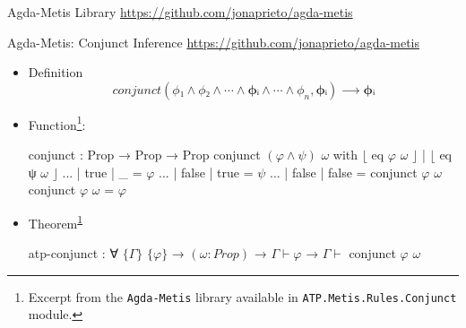 \documentclass[xetex, hyperref={pdfpagelabels=false}]{beamer}
\begin{document}
\begin{frame}[fragile, label=agda-metis]{Agda-Metis Library}
  {\url{https://github.com/jonaprieto/agda-metis}}
\vfill
\begin{table}[!ht]
\begin{center}
\end{center}
\label{tab:agda-metis-table}
\end{table}
\vfill
\end{frame}


\begin{frame}[fragile, label=atp-conjunct]{Agda-Metis: Conjunct Inference}
   {\url{https://github.com/jonaprieto/agda-metis}}
\begin{itemize}
\item Definition
  \begin{equation*}
  conjunct (ϕ₁ ∧  ϕ₂ ∧ ⋯ ∧ \mathbf{ϕᵢ} ∧ ⋯ ∧ \phi_n, \mathbf{ϕᵢ}) ⟶ \mathbf{ϕᵢ}
  \end{equation*}

\item Function\footnote{\label{note-conjunct}Excerpt from the \texttt{Agda-Metis} library available in  \texttt{ATP.Metis.Rules.Conjunct} module.}:
\begin{agda}
conjunct : Prop → Prop → Prop
conjunct $(φ \wedge ψ)$ $ω$ with $⌊$ eq $φ$ $ω$ $⌋$ | $⌊$ eq ψ $ω$ $⌋$
... | true  | _     = $φ$
... | false | true  = $ψ$
... | false | false = conjunct $φ$ $ω$
conjunct $φ$ $ω$       = $φ$
\end{agda}
\item Theorem\textsuperscript{\ref{note-conjunct}}
\begin{agda}
atp-conjunct
  : ∀ $\{Γ\}$ $\{φ\}$
  → $(ω : Prop)$
  → $Γ \vdash φ$
  → $Γ \vdash$ conjunct $φ$ $ω$
\end{agda}
\end{itemize}
\end{frame}
\end{document}

